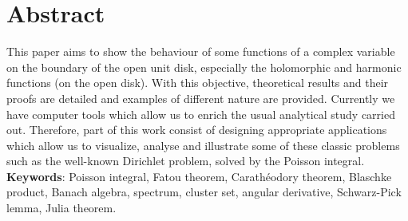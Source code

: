 %
%
%
%
%

\chapter{Abstract}

This paper aims to show the behaviour of some functions of a complex variable on the boundary of the open unit disk, especially the holomorphic and harmonic functions (on the open disk). With this objective, theoretical results and their proofs are detailed and examples of different nature are provided. Currently we have computer tools which allow us to enrich the usual analytical study carried out. Therefore, part of this work consist of designing appropriate applications which allow us to visualize, analyse and illustrate some of these classic problems such as the well-known Dirichlet problem, solved by the Poisson integral. \\

\textbf{Keywords}: Poisson integral, Fatou theorem, Carathéodory theorem, Blaschke product, Banach algebra, spectrum, cluster set, angular derivative, Schwarz-Pick lemma, Julia theorem. \\


\endinput
